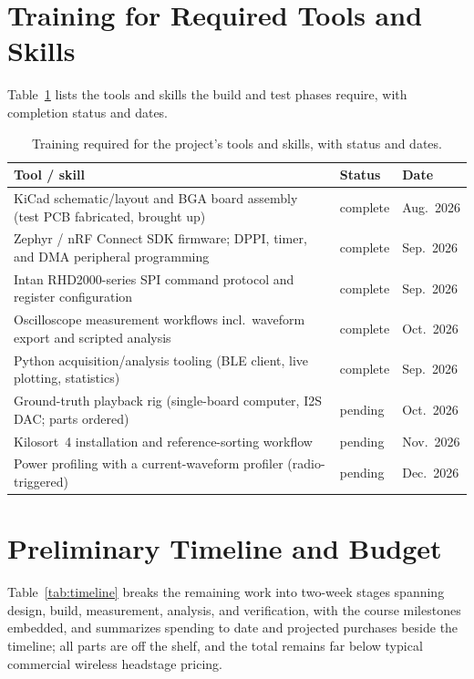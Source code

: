 \documentclass[11pt]{article}
\begin{document}
\section{Training for Required Tools and Skills}
Table~\ref{tab:training} lists the tools and skills the build and test phases require,
with completion status and dates.

\begin{table}[H]
\centering
\caption{Training required for the project's tools and skills, with status and dates.}
\label{tab:training}
{\footnotesize\sffamily
\setlength{\tabcolsep}{4pt}
\renewcommand{\arraystretch}{1.2}
\begin{tabular}{|l|l|l|}
\hline
\textbf{Tool / skill} & \textbf{Status} & \textbf{Date} \\
\hline
KiCad schematic/layout and BGA board assembly (test PCB fabricated, brought up) & complete & Aug.\ 2026 \\
\hline
Zephyr / nRF Connect SDK firmware; DPPI, timer, and DMA peripheral programming & complete & Sep.\ 2026 \\
\hline
Intan RHD2000-series SPI command protocol and register configuration & complete & Sep.\ 2026 \\
\hline
Oscilloscope measurement workflows incl.\ waveform export and scripted analysis & complete & Oct.\ 2026 \\
\hline
Python acquisition/analysis tooling (BLE client, live plotting, statistics) & complete & Sep.\ 2026 \\
\hline
Ground-truth playback rig (single-board computer, I2S DAC; parts ordered) & pending & Oct.\ 2026 \\
\hline
Kilosort~4 installation and reference-sorting workflow & pending & Nov.\ 2026 \\
\hline
Power profiling with a current-waveform profiler (radio-triggered) & pending & Dec.\ 2026 \\
\hline
\end{tabular}
}
\end{table}

\section{Preliminary Timeline and Budget}
Table~\ref{tab:timeline} breaks the remaining work into two-week stages spanning design,
build, measurement, analysis, and verification, with the course milestones embedded, and
summarizes spending to date and projected purchases beside the timeline; all parts are
off the shelf, and the total remains far below typical commercial wireless headstage
pricing.
\end{document}
